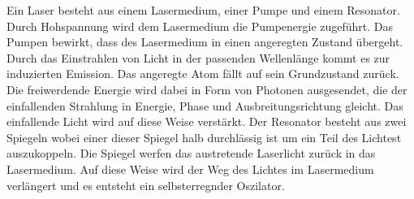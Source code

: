 Ein Laser besteht aus einem Lasermedium, einer Pumpe und einem Resonator.
Durch Hohspannung wird dem Lasermedium die Pumpenergie zugeführt.
Das Pumpen bewirkt, dass des Lasermedium in einen angeregten Zustand übergeht.
Durch das Einstrahlen von Licht in der passenden Wellenlänge kommt es zur induzierten Emission.
Das angeregte Atom fällt auf sein Grundzustand zurück.
Die freiwerdende Energie wird dabei in Form von Photonen ausgesendet, die der einfallenden Strahlung in Energie, Phase und Ausbreitungsrichtung gleicht.
Das einfallende Licht wird auf diese Weise verstärkt.
Der Resonator besteht aus zwei Spiegeln wobei einer dieser Spiegel halb durchlässig ist um ein Teil des Lichtest auszukoppeln.
Die Spiegel werfen das austretende Laserlicht zurück in das Lasermedium.
Auf diese Weise wird der Weg des Lichtes im Lasermedium verlängert und es entsteht ein selbsterregnder Oszilator.
